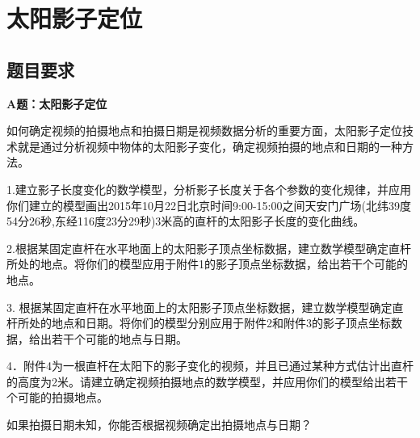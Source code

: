 

\chapter{太阳影子定位}
\section{题目要求}
    \par
    \textbf{A题：太阳影子定位}
    \par
    如何确定视频的拍摄地点和拍摄日期是视频数据分析的重要方面，太阳影子定位技术就是通过分析视频中物体的太阳影子变化，确定视频拍摄的地点和日期的一种方法。
    \par
    1.建立影子长度变化的数学模型，分析影子长度关于各个参数的变化规律，并应用你们建立的模型画出2015年10月22日北京时间9:00-15:00之间天安门广场(北纬39度54分26秒,东经116度23分29秒)3米高的直杆的太阳影子长度的变化曲线。
    \par
    2.根据某固定直杆在水平地面上的太阳影子顶点坐标数据，建立数学模型确定直杆所处的地点。将你们的模型应用于附件1的影子顶点坐标数据，给出若干个可能的地点。
    \par
    3. 根据某固定直杆在水平地面上的太阳影子顶点坐标数据，建立数学模型确定直杆所处的地点和日期。将你们的模型分别应用于附件2和附件3的影子顶点坐标数据，给出若干个可能的地点与日期。
    \par
    4．附件4为一根直杆在太阳下的影子变化的视频，并且已通过某种方式估计出直杆的高度为2米。请建立确定视频拍摄地点的数学模型，并应用你们的模型给出若干个可能的拍摄地点。
    \par
    如果拍摄日期未知，你能否根据视频确定出拍摄地点与日期？
